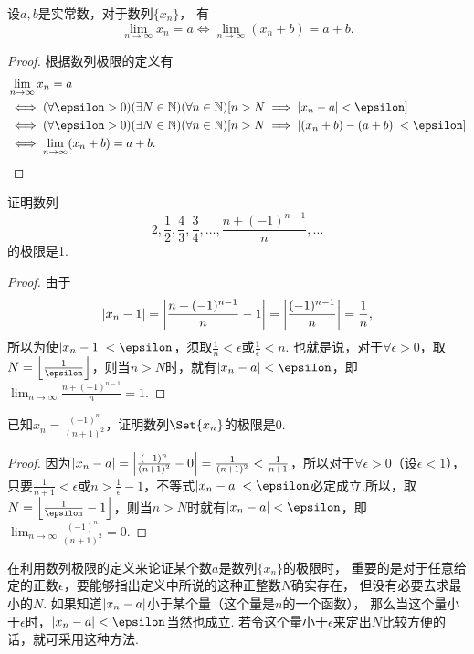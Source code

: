 \begin{proposition}
设\(a,b\)是实常数，对于数列\(\{x_n\}\)，
有\[
	\lim_{n\to\infty} x_n = a
	\iff
	\lim_{n\to\infty} (x_n + b) = a + b.
\]
\begin{proof}
根据数列极限的定义有\begin{align*}
	&\lim_{n\to\infty} x_n = a \\
	&\iff
	(\forall \epsilon > 0)
	(\exists N\in\mathbb{N})
	(\forall n\in\mathbb{N})
	[
		n > N
		\implies
		\abs{x_n - a} < \epsilon
	] \\
	&\iff
	(\forall \epsilon > 0)
	(\exists N\in\mathbb{N})
	(\forall n\in\mathbb{N})
	[
		n > N
		\implies
		\abs{(x_n+b) - (a+b)} < \epsilon
	] \\
	&\iff
	\lim_{n\to\infty} (x_n+b) = a+b.
	\qedhere
\end{align*}
\end{proof}
\end{proposition}

\begin{example}
证明数列\[
2,\frac{1}{2},\frac{4}{3},\frac{3}{4},\dotsc,\frac{n+(-1)^{n-1}}{n},\dotsc
\]的极限是1.
\begin{proof}
由于\[
\abs{x_n - 1}
= \abs{\frac{n+(-1)^{n-1}}{n}-1}
= \abs{\frac{(-1)^{n-1}}{n}}
= \frac{1}{n},
\]所以为使\(\abs{x_n - 1} < \epsilon\)，须取\(\frac{1}{n} < \epsilon\)或\(\frac{1}{\epsilon} < n\).
也就是说，对于\(\forall \epsilon > 0\)，取\(N = \floor*{\frac{1}{\epsilon}}\)，则当\(n > N\)时，就有\(\abs{x_n - a} < \epsilon\)，即\(\lim_{n\to\infty}\frac{n+(-1)^{n-1}}{n}=1\).
\end{proof}
\end{example}

\begin{example}
已知\(x_n = \frac{(-1)^n}{(n+1)^2}\)，证明数列\(\Set{x_n}\)的极限是\(0\).
\begin{proof}
因为\(\abs{x_n - a} = \abs{\frac{(-1)^n}{(n+1)^2}-0} = \frac{1}{(n+1)^2} < \frac{1}{n+1}\)，所以对于\(\forall\epsilon>0\)（设\(\epsilon<1\)），只要\(\frac{1}{n+1}<\epsilon\)或\(n>\frac{1}{\epsilon}-1\)，不等式\(\abs{x_n-a}<\epsilon\)必定成立.所以，取\(N=\floor*{\frac{1}{\epsilon}-1}\)，则当\(n>N\)时就有\(\abs{x_n - a}<\epsilon\)，即\(\lim_{n\to\infty}\frac{(-1)^n}{(n+1)^2}=0\).
\end{proof}
\end{example}

在利用数列极限的定义来论证某个数\(a\)是数列\(\{x_n\}\)的极限时，
重要的是对于任意给定的正数\(\epsilon\)，要能够指出定义中所说的这种正整数\(N\)确实存在，
但没有必要去求最小的\(N\).
如果知道\(\abs{x_n-a}\)小于某个量（这个量是\(n\)的一个函数），
那么当这个量小于\(\epsilon\)时，\(\abs{x_n-a}<\epsilon\)当然也成立.
若令这个量小于\(\epsilon\)来定出\(N\)比较方便的话，就可采用这种方法.

